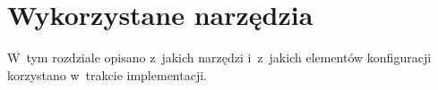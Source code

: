 \documentclass[thesis]{subfiles}
\begin{document}
%
%
%
%
%
%
%
%
%
%
%
%
%


\section{Wykorzystane narzędzia}

W~tym rozdziale opisano z~jakich narzędzi i~z~jakich elementów konfiguracji korzystano w~trakcie implementacji.
\end{document}
